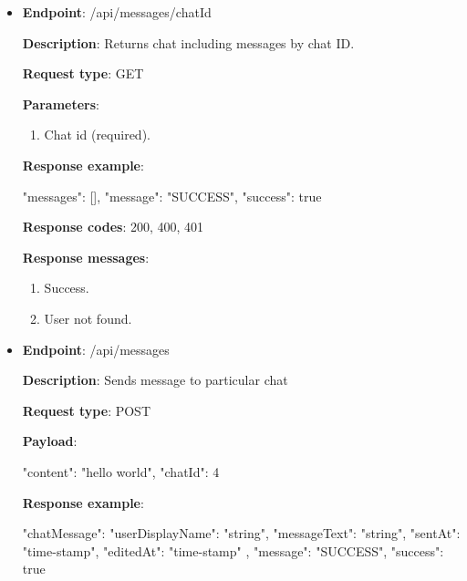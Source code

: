 \begin{itemize}
    \item \textbf{Endpoint}: /api/messages/{chatId}

    \textbf{Description}: Returns chat including messages by chat ID.

    \textbf{Request type}: GET

    \textbf{Parameters}:
    \begin{enumerate}
        \item Chat id (required).
    \end{enumerate}

    \textbf{Response example}:

    \begin{spverbatim}
    {
        "messages": [],
        "message": "SUCCESS",
        "success": true
    }
    \end{spverbatim}

    \textbf{Response codes}: 200, 400, 401

    \textbf{Response messages}:
    \begin{enumerate}
        \item Success.
        \item User not found.
    \end{enumerate}

    \pagebreak

    \item \textbf{Endpoint}: /api/messages

    \textbf{Description}: Sends message to particular chat

    \textbf{Request type}: POST

    \textbf{Payload}:

    \begin{spverbatim}
    {
        "content": "hello world",
        "chatId": 4
    }
    \end{spverbatim}

    \textbf{Response example}:

    \begin{spverbatim}
    {
        "chatMessage": {
            "userDisplayName": "string",
            "messageText": "string",
            "sentAt": "time-stamp",
            "editedAt": "time-stamp"
        },
        "message": "SUCCESS",
        "success": true
    }
    \end{spverbatim}


\end{itemize}
